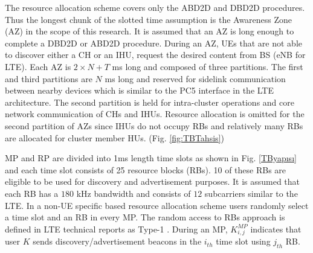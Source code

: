 \documentclass[10pt,a4paper,twocolumn]{article}
\begin{document}
The resource allocation scheme covers only the ABD2D and DBD2D procedures. Thus the longest chunk of the slotted time assumption is the Awareness Zone (AZ) in the scope of this research. It is assumed that an AZ is long enough to complete a DBD2D or ABD2D procedure. During an AZ, UEs that are not able to discover either a CH or an IHU, request the desired content from BS (eNB for LTE).
Each AZ is $2\times N+T$ ms long and composed of three partitions. The first and third partitions are $N$ ms long and reserved for sidelink communication between nearby devices which is similar to the PC5 interface in the LTE architecture. The second partition is held for intra-cluster operations and core network communication of CHs and IHUs. Resource allocation is omitted for the second partition of AZs since IHUs do not occupy RBs and relatively many RBs are allocated for cluster member HUs. (Fig. \ref{fig:TBTahsis})

MP and RP are divided into 1ms length time slots as shown in Fig. \ref{TByapısı} and each time slot consists of 25 resource blocks (RBs). 10 of these RBs are eligible to be used for discovery and advertisement purposes. It is assumed that each RB has a $180$ kHz bandwidth and consists of $12$ subcarriers similar to the LTE. In a non-UE specific based resource allocation scheme users randomly select a time slot and an RB in every MP. The random access to RBs approach is defined in LTE technical reports as Type-1 \cite{36877}. During an MP, $K^{MP}_{i,j}$ indicates that user $K$ sends discovery/advertisement beacons in the $i_{th}$ time slot using $j_{th}$ RB.
\end{document}
